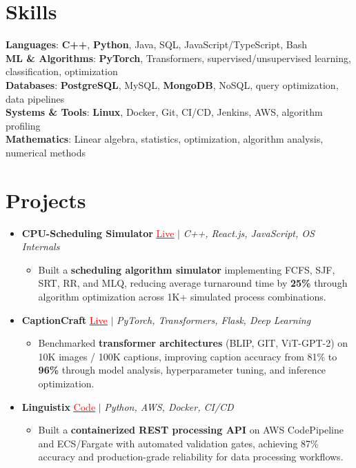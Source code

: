 \documentclass[letterpaper,10pt]{article}
\newcommand{\resumeItem}[1]{\item\small{{#1 \vspace{-2pt}}}}
\newcommand{\resumeProjectHeading}[1]{\item \small #1 \vspace{-2pt}}
\newcommand{\resumeSubHeadingListStart}{\begin{itemize}[leftmargin=0.0in, label={}]}
\newcommand{\resumeSubHeadingListEnd}{\end{itemize}}
\newcommand{\resumeProjItemListStart}{\begin{itemize}[leftmargin=0.15in,label=\textbullet,itemsep=0pt,topsep=0pt,parsep=0pt,partopsep=0pt]}
\newcommand{\resumeProjItemListEnd}{\end{itemize}\vspace{-4pt}}
\begin{document}
\section{Skills}
\begin{itemize}[leftmargin=0.15in, label={}]
\small{\item{
\textbf{Languages}: \textbf{C++}, \textbf{Python}, Java, SQL, JavaScript/TypeScript, Bash \\
\textbf{ML \& Algorithms}: \textbf{PyTorch}, Transformers, supervised/unsupervised learning, classification, optimization \\
\textbf{Databases}: \textbf{PostgreSQL}, MySQL, \textbf{MongoDB}, NoSQL, query optimization, data pipelines \\
\textbf{Systems \& Tools}: \textbf{Linux}, Docker, Git, CI/CD, Jenkins, AWS, algorithm profiling \\
\textbf{Mathematics}: Linear algebra, statistics, optimization, algorithm analysis, numerical methods
}}
\end{itemize}
\vspace{-16pt}
\section{Projects}
\resumeSubHeadingListStart
\vspace{-2pt}
\resumeProjectHeading{\textbf{CPU-Scheduling Simulator} {\href{https://cpu-scheduler-amber.vercel.app/}{\textcolor{red}{\underline{Live}}}} $|$ \emph{C++, React.js, JavaScript, OS Internals}}
\resumeProjItemListStart
\resumeItem{Built a \textbf{scheduling algorithm simulator} implementing FCFS, SJF, SRT, RR, and MLQ, reducing average turnaround time by \textbf{25\%} through algorithm optimization across 1K+ simulated process combinations.}
\resumeProjItemListEnd
\vspace{3pt}
\resumeProjectHeading{\textbf{CaptionCraft} {\href{https://imagecaptiongenerator.com/}{\textcolor{red}{\underline{Live}}}} $|$ \emph{PyTorch, Transformers, Flask, Deep Learning}}
\resumeProjItemListStart
\resumeItem{Benchmarked \textbf{transformer architectures} (BLIP, GIT, ViT-GPT-2) on 10K images / 100K captions, improving caption accuracy from 81\% to \textbf{96\%} through model analysis, hyperparameter tuning, and inference optimization.}
\resumeProjItemListEnd
\vspace{3pt}
\resumeProjectHeading{\textbf{Linguistix} {\href{https://github.com/SAHAJ-BHADJA/Linguistix}{\textcolor{red}{\underline{Code}}}} $|$ \emph{Python, AWS, Docker, CI/CD}}
\resumeProjItemListStart
\resumeItem{Built a \textbf{containerized REST processing API} on AWS CodePipeline and ECS/Fargate with automated validation gates, achieving 87\% accuracy and production-grade reliability for data processing workflows.}
\resumeProjItemListEnd
\resumeSubHeadingListEnd
\end{document}
